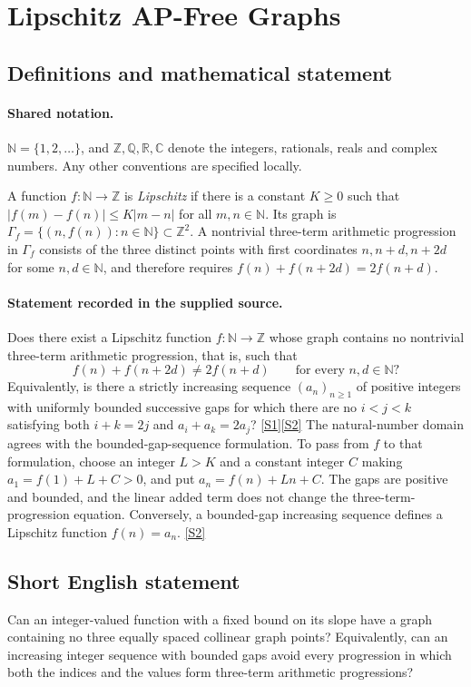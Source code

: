 \documentclass[11pt]{article}
\newcommand{\sref}[2]{\hyperlink{source:#1:#2}{[S#2]}}
\begin{document}
\section{Lipschitz AP-Free Graphs}\label{statement}

\subsection{Definitions and mathematical statement}

\paragraph{Shared notation.}$\mathbb N=\{1,2,\ldots\}$, and $\mathbb Z,\mathbb Q,\mathbb R,\mathbb C$ denote the integers, rationals, reals and complex numbers. Any other conventions are specified locally.


A function $f:\mathbb N\to\mathbb Z$ is \emph{Lipschitz} if there is a constant $K\ge0$ such that $|f(m)-f(n)|\le K|m-n|$ for all $m,n\in\mathbb N$. Its graph is $\Gamma_f=\{(n,f(n)):n\in\mathbb N\}\subset\mathbb Z^2$. A nontrivial three-term arithmetic progression in $\Gamma_f$ consists of the three distinct points with first coordinates $n,n+d,n+2d$ for some $n,d\in\mathbb N$, and therefore requires $f(n)+f(n+2d)=2f(n+d)$.
\paragraph{Statement recorded in the supplied source.}
Does there exist a Lipschitz function $f:\mathbb N\to\mathbb Z$ whose graph contains no nontrivial three-term arithmetic progression, that is, such that
\[
f(n)+f(n+2d)\ne2f(n+d)\qquad\text{for every }n,d\in\mathbb N?
\]
Equivalently, is there a strictly increasing sequence $(a_n)_{n\ge1}$ of positive integers with uniformly bounded successive gaps for which there are no $i<j<k$ satisfying both $i+k=2j$ and $a_i+a_k=2a_j$? \sref{statement}{1}\sref{statement}{2}
The natural-number domain agrees with the bounded-gap-sequence formulation. To pass from $f$ to that formulation, choose an integer $L>K$ and a constant integer $C$ making $a_1=f(1)+L+C>0$, and put $a_n=f(n)+Ln+C$. The gaps are positive and bounded, and the linear added term does not change the three-term-progression equation. Conversely, a bounded-gap increasing sequence defines a Lipschitz function $f(n)=a_n$. \sref{statement}{2}
\subsection{Short English statement}
Can an integer-valued function with a fixed bound on its slope have a graph containing no three equally spaced collinear graph points? Equivalently, can an increasing integer sequence with bounded gaps avoid every progression in which both the indices and the values form three-term arithmetic progressions?
\end{document}
